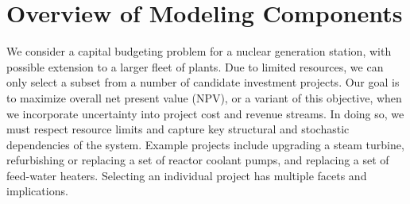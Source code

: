 \section{Overview of Modeling Components}
\label{sec:ModelingComponents}

We consider a capital budgeting problem for a nuclear generation station, with possible
extension to a larger fleet of plants. 
Due to limited resources, we can only select a
subset from a number of candidate investment projects. 
Our goal is to maximize overall net
present value (NPV), or a variant of this objective, when we incorporate uncertainty into
project cost and revenue streams. 
In doing so, we must respect resource limits
and capture key structural and stochastic dependencies of the system. 
Example projects include upgrading a steam turbine, refurbishing or replacing a set of reactor coolant pumps,
and replacing a set of feed-water heaters. 
Selecting an individual project has multiple facets and implications.

